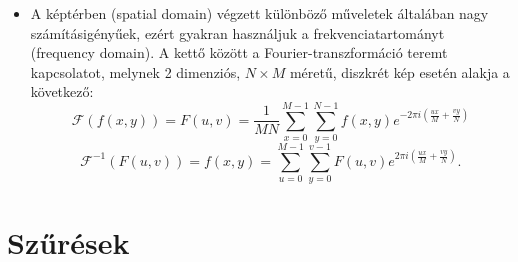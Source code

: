\documentclass[12pt]{article}
\theoremstyle{plain}
\begin{document}
\begin{itemize}
\item A képtérben (spatial domain) végzett különböző műveletek általában nagy számításigényűek, ezért gyakran használjuk a frekvenciatartományt (frequency domain). A kettő között a Fourier-transzformáció teremt kapcsolatot, melynek 2 dimenziós, $N \times M$ méretű, diszkrét kép esetén alakja a következő:
$$\mathcal{F}(f(x,y)) = F(u,v) = \frac{1}{MN}\sum^{M-1}_{x=0}\sum^{N-1}_{y=0}f(x,y)e^{-2\pi i(\frac{ux}{M} + \frac{vy}{N})}$$
$$\mathcal{F}^{-1}(F(u,v)) = f(x,y) = \sum^{M-1}_{u=0}\sum^{v-1}_{y=0}F(u,v)e^{2\pi i(\frac{ux}{M} + \frac{vy}{N})}.$$

\end{itemize}{}




\section{Szűrések}
\end{document}
